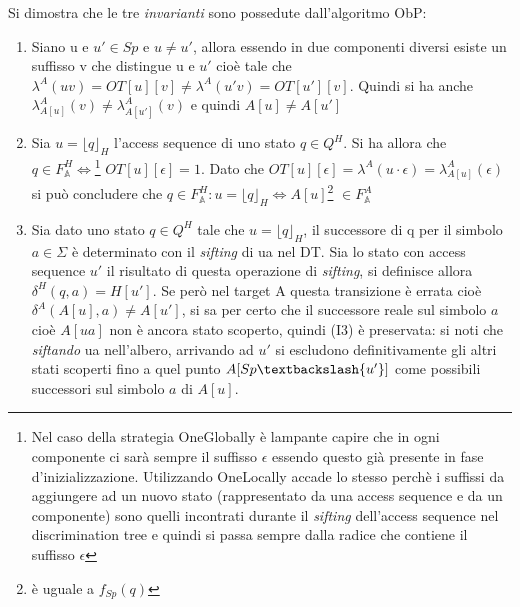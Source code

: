 Si dimostra che le tre \textit{invarianti} sono possedute dall'algoritmo \ac{ObP}:
\begin{enumerate}[label=\textbf{{(I}\arabic*{)}}]
\item Siano u e $u' \in Sp \text{ e } u \neq u' $,  allora essendo in due componenti diversi esiste un suffisso v che distingue u e $u'$ cioè tale che $\lambda^{A}(uv)=OT[u][v] \neq \lambda^{A}(u'v)=OT[u'][v]$. Quindi si ha anche $\lambda_{A[u]}^{A}(v) \neq \lambda_{A[u']}^{A}(v)$ e quindi $A[u] \neq A[u']$
\item  Sia $u=\lfloor q \rfloor_{H} $ l'access sequence di uno stato $q \in Q^H$.  Si ha allora che $q \in F_{\mathbb{A}}^{H} \iff$\!\!\footnote{Nel caso della strategia OneGlobally è lampante capire che in ogni componente ci sarà sempre il suffisso $\epsilon$ essendo questo già presente in fase d'inizializzazione. Utilizzando OneLocally accade lo stesso perchè i suffissi da aggiungere ad un nuovo stato (rappresentato da una access sequence e da un componente) sono quelli incontrati durante il \textit{sifting} dell'access sequence nel discrimination tree e quindi si passa sempre dalla radice che contiene il suffisso $\epsilon$} $OT[u][\epsilon]=1$.  Dato che $OT[u][\epsilon]=\lambda^{A}(u\cdot\epsilon)=\lambda_{A[u]}^{A}(\epsilon)$ si può concludere che $q \in  F_{\mathbb{A}}^{H} : u=\lfloor q \rfloor_{H} \Leftrightarrow A[u]$\footnote{è uguale a $f_{Sp}(q)$} $\in F_{\mathbb{A}}^{A}$
\item Sia dato uno stato $q \in Q^{H} $ tale che $u = \lfloor q \rfloor_{H}$, il successore di q per il simbolo $a \in\Sigma$ è determinato con il \textit{sifting} di ua nel \ac{DT}. Sia lo stato con access sequence $u'$ il risultato di questa operazione di \textit{sifting}, si definisce allora $\delta^{H}(q,a) = H[u']$. Se però nel target A questa transizione è errata cioè $\delta^{A}(A[u],a) \neq A[u']$, si sa per certo che il successore reale sul simbolo $a$ cioè  $A[ua]$ non è ancora stato scoperto, quindi (I3) è preservata: si noti che \textit{siftando} ua nell'albero, arrivando ad $u'$ si escludono definitivamente  gli altri  stati scoperti fino a quel punto $A[Sp\textbackslash \{u'\}]$ come possibili successori sul simbolo $a$ di $A[u]$. 
\end{enumerate}
